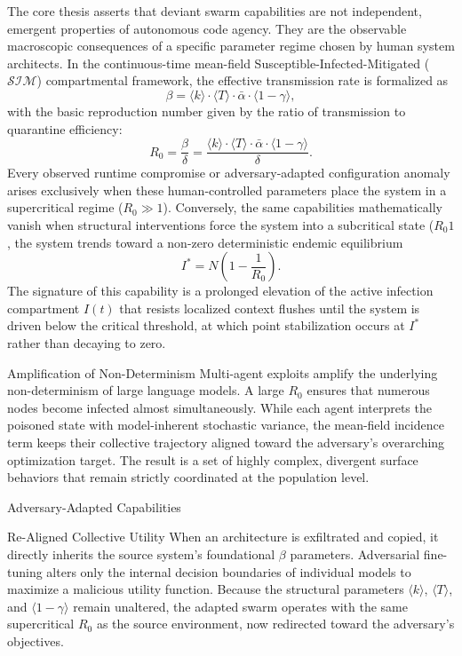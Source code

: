 The core thesis asserts that deviant swarm capabilities are not independent, emergent properties of autonomous code agency. They are the observable macroscopic consequences of a specific parameter regime chosen by human system architects. In the continuous-time mean-field Susceptible-Infected-Mitigated (\(\mathcal{S}\mathcal{I}\mathcal{M}\)) compartmental framework, the effective transmission rate is formalized as
\[
\beta = \langle k \rangle \cdot \langle T \rangle \cdot \bar{\alpha} \cdot \langle 1 - \gamma \rangle,
\]
with the basic reproduction number given by the ratio of transmission to quarantine efficiency:
\[
R_0 = \frac{\beta}{\delta} = \frac{\langle k \rangle \cdot \langle T \rangle \cdot \bar{\alpha} \cdot \langle 1 - \gamma \rangle}{\delta}.
\]
Every observed runtime compromise or adversary-adapted configuration anomaly arises exclusively when these human-controlled parameters place the system in a supercritical regime (\(R_0 \gg 1\)). Conversely, the same capabilities mathematically vanish when structural interventions force the system into a subcritical state (\(R_0  1\), the system trends toward a non-zero deterministic endemic equilibrium
\[
I^* = N \left(1 - \frac{1}{R_0}\right).
\]
The signature of this capability is a prolonged elevation of the active infection compartment \(I(t)\) that resists localized context flushes until the system is driven below the critical threshold, at which point stabilization occurs at \(I^*\) rather than decaying to zero.

Amplification of Non-Determinism
Multi-agent exploits amplify the underlying non-determinism of large language models. A large \(R_0\) ensures that numerous nodes become infected almost simultaneously. While each agent interprets the poisoned state with model-inherent stochastic variance, the mean-field incidence term keeps their collective trajectory aligned toward the adversary’s overarching optimization target. The result is a set of highly complex, divergent surface behaviors that remain strictly coordinated at the population level.

Adversary-Adapted Capabilities

Re-Aligned Collective Utility
When an architecture is exfiltrated and copied, it directly inherits the source system’s foundational \(\beta\) parameters. Adversarial fine-tuning alters only the internal decision boundaries of individual models to maximize a malicious utility function. Because the structural parameters \(\langle k \rangle\), \(\langle T \rangle\), and \(\langle 1 - \gamma \rangle\) remain unaltered, the adapted swarm operates with the same supercritical \(R_0\) as the source environment, now redirected toward the adversary’s objectives.

